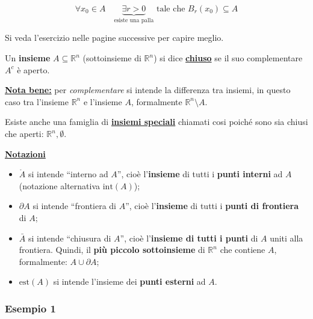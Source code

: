 \documentclass[a4paper]{article}
\newcommand{\dquotes}[1]{``#1''}
\begin{document}
	\begin{equation*}
		\forall x_{0} \in A \hspace{1em} \underbrace{\exists r > 0}_{\text{esiste una palla}} \text{ tale che } B_{r}\left(x_{0}\right)\subseteq A
	\end{equation*}

	\noindent
	Si veda l'esercizio nelle pagine successive per capire meglio.\newline
	
	\noindent
	Un \textbf{insieme} $A \subseteq \mathbb{R}^{n}$ (sottoinsieme di $\mathbb{R}^{n}$) si dice \textcolor{Red3}{\textbf{\underline{chiuso}}} se il suo complementare $A^{c}$ è aperto.

	\noindent
	\textbf{\underline{Nota bene:}} per \emph{complementare} si intende la differenza tra insiemi, in questo caso tra l'insieme $\mathbb{R}^{n}$ e l'insieme $A$, formalmente $\mathbb{R}^{n} \setminus A$.\newline
	
	\noindent
	Esiste anche una famiglia di \textcolor{Red3}{\textbf{\underline{insiemi speciali}}} chiamati cosi poiché sono sia chiusi che aperti: $\mathbb{R}^{n}, \emptyset$.\newline
	
	\noindent
	\textcolor{Red3}{\textbf{\underline{Notazioni}}}
	
	\noindent
	\begin{itemize}
		\item $\mathring{A}$ si intende \dquotes{interno ad $A$}, cioè l'\textbf{insieme} di tutti i \textbf{punti interni} ad $A$ (notazione alternativa $\mathrm{int}\left(A\right)$);
		
		\item $\partial A$ si intende \dquotes{frontiera di $A$}, cioè l'\textbf{insieme} di tutti i \textbf{punti di frontiera} di $A$;
		
		\item $\bar{A}$ si intende \dquotes{chiusura di $A$}, cioè l'\textbf{insieme di tutti i punti} di $A$ uniti alla frontiera. Quindi, il \textbf{più piccolo sottoinsieme} di $\mathbb{R}^{n}$ che contiene $A$, formalmente: $A \cup \partial A$;
		
		\item $\mathrm{est}\left(A\right)$ si intende l'insieme dei \textbf{punti esterni} ad $A$.
	\end{itemize}

	\newpage
	
	\subsubsection[Esempio 1]{\textcolor{Green4}{Esempio 1}}
	
\end{document}
